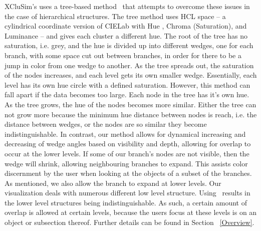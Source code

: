 \documentclass[review,journal]{vgtc}         %
\begin{document}
XCluSim’s uses a tree-based method~\cite{tennekes2014tree} that attempts to overcome these issues in the case of hierarchical structures. 
The tree method uses HCL space – a cylindrical coordinate version of CIELab with Hue , Chroma (Saturation), and Luminance – and gives each cluster a different hue. 
The root of the tree has no saturation, i.e. grey, and the hue is divided up into different wedges, one for each branch, with some space cut out between branches, in order for there to be a jump in color from one wedge to another. 
As the tree spreads out, the saturation of the nodes increases, and each level gets its own smaller wedge. 
Essentially, each level has its own hue circle with a defined saturation. 
However, this method can fall apart if the data becomes too large. Each node in the tree has it's own hue. 
As the tree grows, the hue of the nodes becomes more similar. 
Either the tree can not grow more because the minimum hue distance between nodes is reach, i.e. the distance between wedges, or the nodes are so similar they become indistinguishable. 
In contrast, our method allows for dynamical increasing and decreasing of wedge angles based on visibility and depth, allowing for overlap to occur at the lower levels. 
If some of our branch's nodes are not visible, then the wedge will shrink, allowing neighbouring branches to expand. 
This assists color discernment by the user when looking at the objects of a subset of the branches.
As mentioned, we also allow the branch to expand at lower levels.
Our visualization deals with numerous different low level structure. 
Using~\cite{tennekes2014tree} results in the lower level structures being indistinguishable. 
As such, a certain amount of overlap is allowed at certain levels, because the users focus at these levels is on an object or subsection thereof. 
Further details can be found in Section ~\ref{Overview}.

%
%
\end{document}

